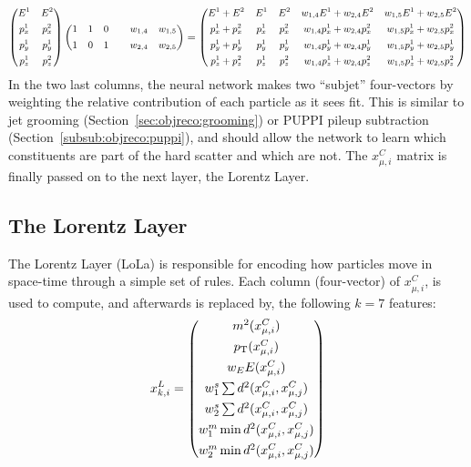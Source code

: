 \begin{equation*}
  \footnotesize
  \begin{centering}
  \begin{pmatrix}
    E^1 & E^2\\[1ex]
    p_x^1 & p_x^2\\[1ex]
    p_y^1 & p_y^1\\[1ex]
    p_z^1 & p_z^2
  \end{pmatrix}
  \begin{pmatrix}
    1 & 1 & 0 & & w_{1,4} & w_{1,5}\\[1ex]
    1 & 0 & 1 & & w_{2,4} & w_{2,5}\\
  \end{pmatrix}
  = \begin{pmatrix}
    E^1  +E^2   & E^1   & E^2   & w_{1,4}E^1   + w_{2,4}E^2   & w_{1,5}E^1  +w_{2,5}E^2    \\[1ex]
    p_x^1+p_x^2 & p_x^1 & p_x^2 & w_{1,4}p_x^1 + w_{2,4}p_x^2 & w_{1,5}p_x^1+w_{2,5}p_x^2  \\[1ex]
    p_y^1+p_y^1 & p_y^1 & p_y^1 & w_{1,4}p_y^1 + w_{2,4}p_y^1 & w_{1,5}p_y^1+w_{2,5}p_y^1  \\[1ex]
    p_z^1+p_z^2 & p_z^1 & p_z^2 & w_{1,4}p_z^1 + w_{2,4}p_z^2 & w_{1,5}p_z^1+w_{2,5}p_z^2
  \end{pmatrix}
   \end{centering}
\end{equation*}
 In the two last columns, the neural network makes two ``subjet'' four-vectors by weighting the relative contribution of each particle as it sees fit. This is similar to jet grooming (Section~\ref{sec:objreco:grooming}) or PUPPI pileup subtraction (Section~\ref{subsub:objreco:puppi}), and should allow the network to learn which constituents are part of the hard scatter and which are not. The $x_{\mu,i}^{C}$ matrix is finally passed on to the next layer, the Lorentz Layer.
\subsection{The Lorentz Layer}
The Lorentz Layer (LoLa) is responsible for encoding how particles move in space-time through a simple set of rules. Each column (four-vector) of $x_{\mu,i}^{C}$, is used to compute, and afterwards is replaced by, the following $k=7$ features:
\begin{equation}
  x_{k,i}^{L} = \begin{pmatrix}
  m^2  (x_{\mu,i}^{C})                       \\[1ex]
  p_{\mathrm{T}}  (x_{\mu,i}^{C})                       \\[1ex]
  w_E E(x_{\mu,i}^{C})                       \\[1ex]
  w^s_1\sum d^2(x_{\mu,i}^{C},x_{\mu,j}^{C}) \\[1ex]
  w^s_2\sum d^2(x_{\mu,i}^{C},x_{\mu,j}^{C}) \\[1ex]
  w^m_1\min d^2(x_{\mu,i}^{C},x_{\mu,j}^{C}) \\[1ex]
  w^m_2\min d^2(x_{\mu,i}^{C},x_{\mu,j}^{C}) 
  \end{pmatrix}
\end{equation}

